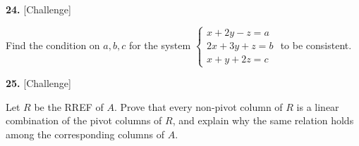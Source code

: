 \documentclass[11pt]{article}
\begin{document}
\begin{minipage}{\linewidth}\textbf{24.} \hfill{\scriptsize\color{ink}[Challenge]}\par\nopagebreak Find the condition on $a,b,c$ for the system $\begin{cases}x+2y-z=a\\ 2x+3y+z=b\\ x+y+2z=c\end{cases}$ to be consistent.
\vspace{4.6cm}\end{minipage}\par\vspace{4pt}
\begin{minipage}{\linewidth}\textbf{25.} \hfill{\scriptsize\color{ink}[Challenge]}\par\nopagebreak Let $R$ be the RREF of $A$. Prove that every non-pivot column of $R$ is a linear combination of the pivot columns of $R$, and explain why the same relation holds among the corresponding columns of $A$.
\vspace{4.4cm}\end{minipage}\par\vspace{4pt}
\end{document}
